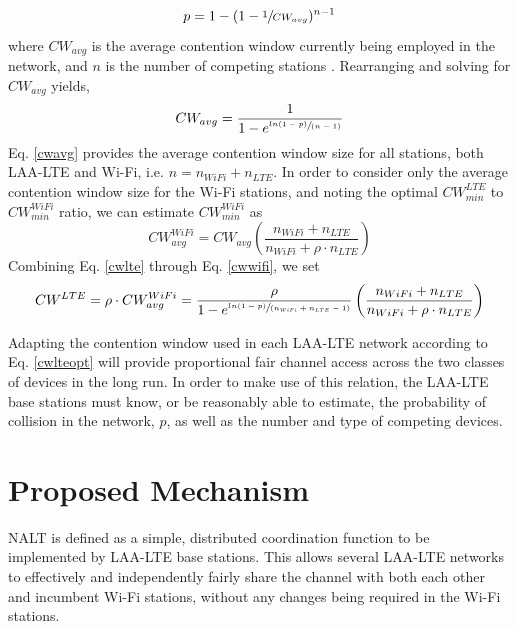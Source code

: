 \begin{equation}\label{pcollision}
p = 1-(1-\sfrac{1}{CW_{avg}})^{n-1}
\end{equation}
where $CW_{avg}$ is the average contention window currently being employed in the network, and $n$ is the number of competing stations \cite{vu}.  Rearranging and solving for $CW_{avg}$ yields,
\begin{equation}\label{cwavg}
CW_{avg} = \frac{1}{1-e^{ \sfrac{ln(1-p)}{(n-1)} }}
\end{equation}
Eq. \ref{cwavg} provides the average contention window size for all stations, both LAA-LTE and Wi-Fi, i.e. $n = n_{WiFi} + n_{LTE}$.  In order to consider only the average contention window size for the \mbox{Wi-Fi} stations, and noting the optimal $CW^{LTE}_{min}$ to $CW^{WiFi}_{min}$ ratio, we can estimate $CW^{WiFi}_{min}$ as
\begin{equation}\label{cwwifi}
CW^{WiFi}_{avg} = CW_{avg}\left ( \frac{n_{WiFi} + n_{LTE}}{n_{WiFi} + \rho\cdot n_{LTE}} \right )
\end{equation}
Combining Eq. \ref{cwlte} through Eq. \ref{cwwifi},  we set 
\begin{equation}\label{cwlteopt}
CW^{LTE} = \rho \cdot{CW^{WiFi}_{avg}} = \frac{\rho}{1-e^{ \sfrac{ln(1-p)}{(n_{WiFi} + n_{LTE}-1)} }}\left ( \frac{n_{WiFi} + n_{LTE}}{n_{WiFi} + \rho\cdot n_{LTE}} \right )
\end{equation}

Adapting the contention window used in each LAA-LTE network according to Eq. \ref{cwlteopt} will provide proportional fair channel access across the two classes of devices in the long run.  In order to make use of this relation, the LAA-LTE base stations must know, or be reasonably able to estimate, the probability of collision in the network, $p$, as well as the number and type of competing devices.  

\section{Proposed Mechanism}
\label{proposed}
NALT is defined as a simple, distributed coordination function to be implemented by LAA-LTE base stations.  This allows several LAA-LTE networks to effectively and independently fairly share the channel with both each other and incumbent Wi-Fi stations, without any changes being required in the Wi-Fi stations.

